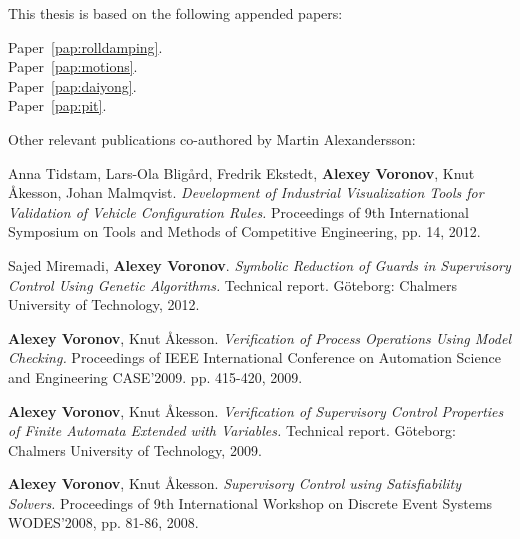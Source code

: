 
\begin{refsection}

This thesis is based on the following appended papers:

\begin{description}
\item[Paper~\ref{pap:rolldamping}.]

\item[Paper~\ref{pap:motions}.] 

\item[Paper~\ref{pap:daiyong}.] 

\item[Paper~\ref{pap:pit}.] 

\end{description}

\vspace{1cm}

\noindent Other relevant publications co-authored by Martin Alexandersson:
\begin{description}
\normalsize
\newcommand{\ME}{{\bfseries Alexey Voronov}}

\item Anna Tidstam, Lars-Ola Bligård, Fredrik Ekstedt, \ME, Knut Åkesson, Johan Malmqvist. \emph{Development of Industrial Visualization Tools for Validation of Vehicle Configuration Rules.} Proceedings of 9th International Symposium on Tools and Methods of Competitive Engineering, pp. 14, 2012.

\item Sajed Miremadi, \ME. \emph{Symbolic Reduction of Guards in Supervisory Control Using Genetic Algorithms.} Technical report. Göteborg: Chalmers University of Technology, 2012.

\item \ME, Knut Åkesson. \emph{Verification of Process Operations Using Model Checking.} Proceedings of IEEE International Conference on Automation Science and Engineering CASE'2009. pp. 415-420, 2009.

\item \ME, Knut Åkesson. \emph{Verification of Supervisory Control Properties of Finite Automata Extended with Variables.} Technical report. Göteborg: Chalmers University of Technology, 2009.

\item \ME, Knut Åkesson. \emph{Supervisory Control using Satisfiability Solvers.} Proceedings of 9th International Workshop on Discrete Event Systems WODES'2008, pp. 81-86, 2008.
\end{description}

\end{refsection}

